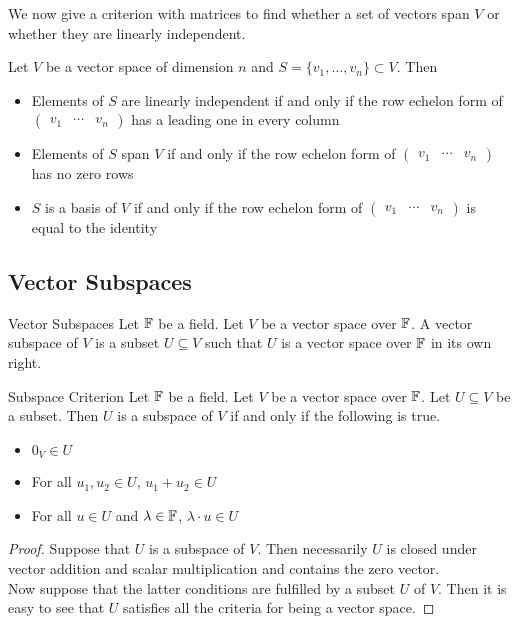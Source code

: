 \documentclass[a4paper]{article}
\begin{document}
We now give a criterion with matrices to find whether a set of vectors span $V$ or whether they are linearly independent. 

\begin{thm}{}{} Let $V$ be a vector space of dimension $n$ and $S=\{v_1,\dots,v_n\}\subset V$. Then 
\begin{itemize}
\item Elements of $S$ are linearly independent if and only if the row echelon form of $\begin{pmatrix}v_1 & \cdots & v_n\end{pmatrix}$ has a leading one in every column
\item Elements of $S$ span $V$ if and only if the row echelon form of $\begin{pmatrix}v_1 & \cdots & v_n\end{pmatrix}$ has no zero rows
\item $S$ is a basis of $V$ if and only if the row echelon form of $\begin{pmatrix}v_1 & \cdots & v_n\end{pmatrix}$ is equal to the identity
\end{itemize}
\end{thm}

\subsection{Vector Subspaces}
\begin{defn}{Vector Subspaces}{} Let $\mathbb{F}$ be a field. Let $V$ be a vector space over $\mathbb{F}$. A vector subspace of $V$ is a subset $U\subseteq V$ such that $U$ is a vector space over $\mathbb{F}$ in its own right. 
\end{defn}

\begin{prp}{Subspace Criterion}{} Let $\mathbb{F}$ be a field. Let $V$ be a vector space over $\mathbb{F}$. Let $U\subseteq V$ be a subset. Then $U$ is a subspace of $V$ if and only if the following is true. 
\begin{itemize}
\item $0_V\in U$
\item For all $u_1,u_2\in U$, $u_1+u_2\in U$
\item For all $u\in U$ and $\lambda\in\mathbb{F}$, $\lambda\cdot u\in U$
\end{itemize} 
\begin{proof}
Suppose that $U$ is a subspace of $V$. Then necessarily $U$ is closed under vector addition and scalar multiplication and contains the zero vector. \\
Now suppose that the latter conditions are fulfilled by a subset $U$ of $V$. Then it is easy to see that $U$ satisfies all the criteria for being a vector space. 
\end{proof}
\end{prp}
\end{document}
